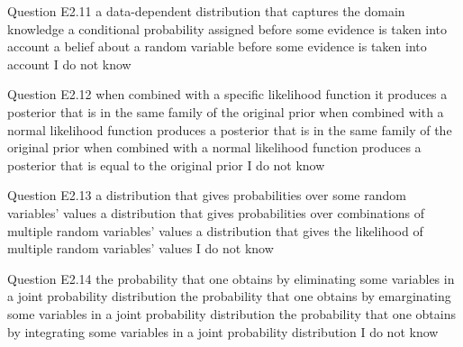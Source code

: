 \begin{frame}{Question E2.11}
	\QuestionNotes{}
	\QuestionAnswers
	{
		\answer a data-dependent distribution that captures the domain knowledge
		\answer a conditional probability assigned before some evidence is taken into account
		\correctanswer a belief about a random variable before some evidence is taken into account
		\answer I do not know
	}
\end{frame}


\begin{frame}{Question E2.12}
	\QuestionNotes{}
	\QuestionAnswers
	{
		\correctanswer when combined with a specific likelihood function it produces a posterior that is in the same family of the original prior
		\answer when combined with a normal likelihood function produces a posterior that is in the same family of the original prior
		\answer when combined with a normal likelihood function produces a posterior that is equal to the original prior
		\answer I do not know
	}
\end{frame}


\begin{frame}{Question E2.13}
	\QuestionNotes{}
	\QuestionAnswers
	{
		\answer a distribution that gives probabilities over some random variables' values
		\correctanswer a distribution that gives probabilities over combinations of multiple random variables' values
		\answer a distribution that gives the likelihood of multiple random variables' values
		\answer I do not know
	}
\end{frame}


\begin{frame}{Question E2.14}
	\QuestionNotes{}
	\QuestionAnswers
	{
		\answer the probability that one obtains by eliminating some variables in a joint probability distribution
		\answer the probability that one obtains by emarginating some variables in a joint probability distribution
		\correctanswer the probability that one obtains by integrating some variables in a joint probability distribution
		\answer I do not know
	}
\end{frame}


